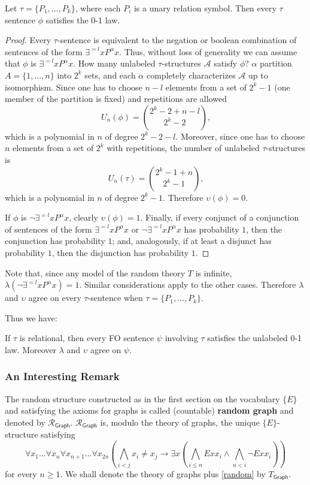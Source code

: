 \begin{lem} Let $\tau=\{P_1, \ldots, P_k\}$, where each $P_i$ is a unary relation symbol.
Then every $\tau$ sentence $\phi$ satisfies the 0-1 law. 
\begin{proof} 
Every $\tau$-sentence is equivalent to the negation or boolean combination of sentences of the form $\exists ^{=l} x P^{\alpha} x$. 
Thus, without loss of generality we can assume that $\phi$ is $\exists ^{=l} x P^{\alpha} x$. 
How many unlabeled $\tau$-structures $\mathcal{A}$ satisfy $\phi$? $\alpha$ partition $A=\{1, \ldots, n\}$ into $2^k$ sets, and each $\alpha$ completely characterizes $\mathcal{A}$ up to isomorphism. 
Since one has to choose $n-l$ elements from a set of $2^k -1$ (one member of the partition is fixed) and repetitions are allowed
$$U_n(\phi)=\binom{2^k -2 + n-l}{2^k-2} \text{,}$$ which is a polynomial in $n$ of degree $2^k-2-l$. 
Moreover, since one has to choose $n$ elements from a set of $2^k$ with repetitions, the number of unlabeled $\tau$-structures is 
$$U_n(\tau)=\binom{2^k -1 + n}{2^k-1} \text{,}$$ which is a polynomial in $n$ of degree $2^k-1$.
Therefore $\upsilon(\phi)=0$. 

If $\phi$ is $\lnot \exists ^{=l} x P^{\alpha} x$, clearly $\upsilon(\phi)=1$. Finally, if every conjunct of a conjunction of sentences of the form $\exists ^{=l} x P^{\alpha} x$ or $\lnot \exists ^{=l} x P^{\alpha} x$ has probability $1$, then the conjunction has probability $1$; and, analogously, if at least a disjunct has probability $1$, then the disjunction has probability $1$. 
\end{proof}
\end{lem}

Note that, since any model of the random theory $T$ is infinite, $\lambda(\lnot \exists ^{=l} x P^{\alpha} x)=1$. 
Similar considerations apply to the other cases. 
Therefore $\lambda$ and $\upsilon$ agree on every $\tau$-sentence when $\tau=\{P_1, \ldots, P_k\}$. 

Thus we have: 

\begin{thm} If $\tau$ is relational, then every FO sentence $\psi$ involving $\tau$ satisfies the unlabeled 0-1 law. Moreover $\lambda$ and $\upsilon$ agree on $\psi$. 
\end{thm}

\subsubsection{An Interesting Remark} 
The random structure constructed as in the first section on the vocabulary $\{E\}$ and satisfying the axioms for graphs is called (countable) \textbf{random graph} and denoted by $\mathcal{R}_{\mathsf{Graph}}$. 
$\mathcal{R}_{\mathsf{Graph}}$ is, modulo the theory of graphs, the unique $\{E\}$-structure satisfying 
\begin{equation} 
\label{random}
\forall x_1 \ldots \forall x_n \forall x_{n+1} \ldots \forall x_{2n} \left ( \bigwedge_{i <j} x_i \neq x_j \rightarrow \exists x \left( \bigwedge_{i\le n} Exx_i \land \bigwedge_{n <i } \lnot Exx_i \right) \right)
\end{equation}
for every $n \ge 1$. We shall denote the theory of graphs plus \ref{random} by $T_{\mathsf{Graph}}$. 

